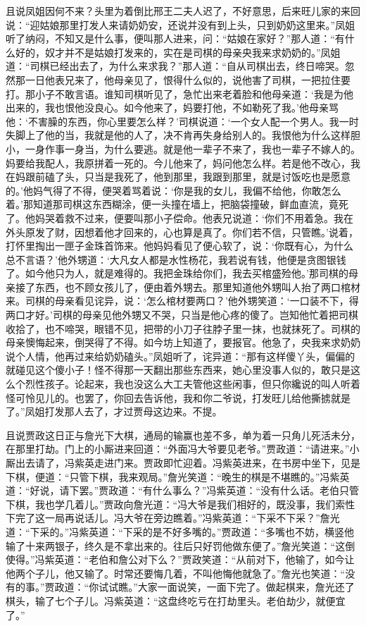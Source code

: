 \begin{parag}
    且说凤姐因何不来？头里为着倒比邢王二夫人迟了，不好意思，后来旺儿家的来回说：“迎姑娘那里打发人来请奶奶安，还说并没有到上头，只到奶奶这里来。”凤姐听了纳闷，不知又是什么事，便叫那人进来，问：“姑娘在家好？”那人道：“有什么好的，奴才并不是姑娘打发来的，实在是司棋的母亲央我来求奶奶的。”凤姐道：“司棋已经出去了，为什么来求我？”那人道：“自从司棋出去，终日啼哭。忽然那一日他表兄来了，他母亲见了，恨得什么似的，说他害了司棋，一把拉住要打。那小子不敢言语。谁知司棋听见了，急忙出来老着脸和他母亲道：‘我是为他出来的，我也恨他没良心。如今他来了，妈要打他，不如勒死了我。’他母亲骂他：‘不害臊的东西，你心里要怎么样？’司棋说道：‘一个女人配一个男人。我一时失脚上了他的当，我就是他的人了，决不肯再失身给别人的。我恨他为什么这样胆小，一身作事一身当，为什么要逃。就是他一辈子不来了，我也一辈子不嫁人的。妈要给我配人，我原拼着一死的。今儿他来了，妈问他怎么样。若是他不改心，我在妈跟前磕了头，只当是我死了，他到那里，我跟到那里，就是讨饭吃也是愿意的。’他妈气得了不得，便哭着骂着说：‘你是我的女儿，我偏不给他，你敢怎么着。’那知道那司棋这东西糊涂，便一头撞在墙上，把脑袋撞破，鲜血直流，竟死了。他妈哭着救不过来，便要叫那小子偿命。他表兄说道：‘你们不用着急。我在外头原发了财，因想着他才回来的，心也算是真了。你们若不信，只管瞧。’说着，打怀里掏出一匣子金珠首饰来。他妈妈看见了便心软了，说：‘你既有心，为什么总不言语？’他外甥道：‘大凡女人都是水性杨花，我若说有钱，他便是贪图银钱了。如今他只为人，就是难得的。我把金珠给你们，我去买棺盛殓他。’那司棋的母亲接了东西，也不顾女孩儿了，便由着外甥去。那里知道他外甥叫人抬了两口棺材来。司棋的母亲看见诧异，说：‘怎么棺材要两口？’他外甥笑道：‘一口装不下，得两口才好。’司棋的母亲见他外甥又不哭，只当是他心疼的傻了。岂知他忙着把司棋收拾了，也不啼哭，眼错不见，把带的小刀子往脖子里一抹，也就抹死了。司棋的母亲懊悔起来，倒哭得了不得。如今坊上知道了，要报官。他急了，央我来求奶奶说个人情，他再过来给奶奶磕头。”凤姐听了，诧异道：“那有这样傻丫头，偏偏的就碰见这个傻小子！怪不得那一天翻出那些东西来，她心里没事人似的，敢只是这么个烈性孩子。论起来，我也没这么大工夫管他这些闲事，但只你纔说的叫人听着怪可怜见儿的。也罢了，你回去告诉他，我和你二爷说，打发旺儿给他撕掳就是了。”凤姐打发那人去了，才过贾母这边来。不提。
\end{parag}


\begin{parag}
    且说贾政这日正与詹光下大棋，通局的输赢也差不多，单为着一只角儿死活未分，在那里打劫。门上的小厮进来回道：“外面冯大爷要见老爷。”贾政道：“请进来。”小厮出去请了，冯紫英走进门来。贾政即忙迎着。冯紫英进来，在书房中坐下，见是下棋，便道：“只管下棋，我来观局。”詹光笑道：“晚生的棋是不堪瞧的。”冯紫英道：“好说，请下罢。”贾政道：“有什么事么？”冯紫英道：“没有什么话。老伯只管下棋，我也学几着儿。”贾政向詹光道：“冯大爷是我们相好的，既没事，我们索性下完了这一局再说话儿。冯大爷在旁边瞧着。”冯紫英道：“下采不下采？”詹光道：“下采的。”冯紫英道：“下采的是不好多嘴的。”贾政道：“多嘴也不妨，横竖他输了十来两银子，终久是不拿出来的。往后只好罚他做东便了。”詹光笑道：“这倒使得。”冯紫英道：“老伯和詹公对下么？”贾政笑道：“从前对下，他输了，如今让他两个子儿，他又输了。时常还要悔几着，不叫他悔他就急了。”詹光也笑道：“没有的事。”贾政道：“你试试瞧。”大家一面说笑，一面下完了。做起棋来，詹光还了棋头，输了七个子儿。冯紫英道：“这盘终吃亏在打劫里头。老伯劫少，就便宜了。”
\end{parag}


